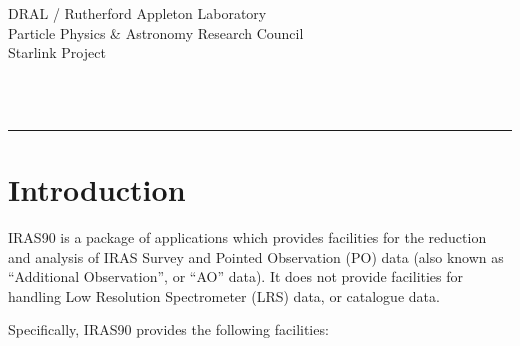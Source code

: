 \thispagestyle{empty}
DRAL / {\sc Rutherford Appleton Laboratory} \hfill {\bf \stardocname}\\
{\large Particle Physics \& Astronomy Research Council}\\
{\large Starlink Project\\}
{\large \stardoccategory\ \stardocnumber}
\begin{flushright}
\stardocauthors\\
\stardocdate
\end{flushright}
\vspace{-4mm}
\rule{\textwidth}{0.5mm}
\vspace{5mm}
\begin{center}
{\Large\bf \stardoctitle}
\end{center}
\vspace{5mm}

\setlength{\parskip}{0mm} \tableofcontents
\setlength{\parskip}{\medskipamount} \markright{\stardocname} \newpage 

\section{Introduction}
{\small IRAS90} is a package of applications which provides facilities for the
reduction and analysis of {\small IRAS} Survey and Pointed Observation (PO) data (also
known as ``Additional Observation'', or ``AO'' data). It does not provide
facilities for handling Low Resolution Spectrometer (LRS) data, or catalogue
data. 

Specifically, {\small IRAS90} provides the following facilities:

